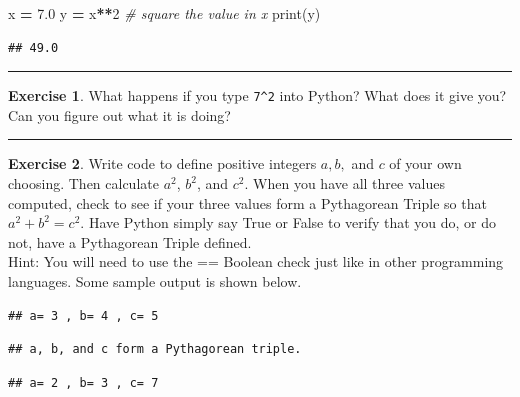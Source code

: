 \documentclass[
]{book}
\newenvironment{Shaded}{\begin{snugshade}}{\end{snugshade}}
\newcommand{\BuiltInTok}[1]{#1}
\newcommand{\CommentTok}[1]{\textcolor[rgb]{0.56,0.35,0.01}{\textit{#1}}}
\newcommand{\DecValTok}[1]{\textcolor[rgb]{0.00,0.00,0.81}{#1}}
\newcommand{\FloatTok}[1]{\textcolor[rgb]{0.00,0.00,0.81}{#1}}
\newcommand{\NormalTok}[1]{#1}
\newcommand{\OperatorTok}[1]{\textcolor[rgb]{0.81,0.36,0.00}{\textbf{#1}}}
\theoremstyle{definition}
\theoremstyle{definition}
\theoremstyle{definition}
\newtheorem{exercise}{Exercise}[chapter]
\theoremstyle{remark}
\begin{document}
\begin{Shaded}
\begin{Highlighting}[]
\NormalTok{x }\OperatorTok{=} \FloatTok{7.0}
\NormalTok{y }\OperatorTok{=}\NormalTok{ x}\OperatorTok{**}\DecValTok{2} \CommentTok{\# square the value in x}
\BuiltInTok{print}\NormalTok{(y)}
\end{Highlighting}
\end{Shaded}

\begin{verbatim}
## 49.0
\end{verbatim}

\begin{center}\rule{0.5\linewidth}{0.5pt}\end{center}

\begin{exercise}
\protect\hypertarget{exr:unnamed-chunk-629}{}{\label{exr:unnamed-chunk-629} }What happens if you type \texttt{7\^{}2} into Python? What does it give you? Can
you figure out what it is doing?
\end{exercise}

\begin{center}\rule{0.5\linewidth}{0.5pt}\end{center}

\begin{exercise}
\protect\hypertarget{exr:unnamed-chunk-630}{}{\label{exr:unnamed-chunk-630} }Write code to define positive integers \(a,b,\) and \(c\) of your own choosing. Then calculate \(a^2\), \(b^2\), and \(c^2\). When you have all three values computed, check to see if your three values form a Pythagorean Triple so that \(a^2 + b^2 = c^2\). Have Python simply say True or False to verify that you do, or do not, have a Pythagorean Triple defined.\\
Hint: You will need to use the == Boolean check just like in other programming languages. Some sample output is shown below.
\end{exercise}

\begin{verbatim}
## a= 3 , b= 4 , c= 5
\end{verbatim}

\begin{verbatim}
## a, b, and c form a Pythagorean triple.
\end{verbatim}

\begin{verbatim}
## a= 2 , b= 3 , c= 7
\end{verbatim}
\end{document}
